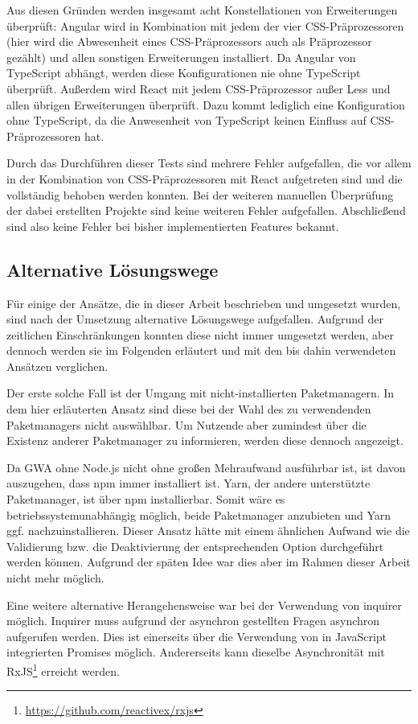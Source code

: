 Aus diesen Gründen werden insgesamt acht Konstellationen von Erweiterungen überprüft: Angular wird in Kombination mit jedem der vier CSS-Präprozessoren (hier wird die Abwesenheit eines CSS-Präprozessors auch als Präprozessor gezählt) und allen sonstigen Erweiterungen installiert. Da Angular von TypeScript abhängt, werden diese Konfigurationen nie ohne TypeScript überprüft. Außerdem wird React mit jedem CSS-Präprozessor außer Less und allen übrigen Erweiterungen überprüft. Dazu kommt lediglich eine Konfiguration ohne TypeScript, da die Anwesenheit von TypeScript keinen Einfluss auf CSS-Präprozessoren hat.

Durch das Durchführen dieser Tests sind mehrere Fehler aufgefallen, die vor allem in der Kombination von CSS-Präprozessoren mit React aufgetreten sind und die vollständig behoben werden konnten. Bei der weiteren manuellen Überprüfung der dabei erstellten Projekte sind keine weiteren Fehler aufgefallen. Abschließend sind also keine Fehler bei bisher implementierten Features bekannt.

\subsection{Alternative Lösungswege}
Für einige der Ansätze, die in dieser Arbeit beschrieben und umgesetzt wurden, sind nach der Umsetzung alternative Lösungswege aufgefallen. Aufgrund der zeitlichen Einschränkungen konnten diese nicht immer umgesetzt werden, aber dennoch werden sie im Folgenden erläutert und mit den bis dahin verwendeten Ansätzen verglichen.

Der erste solche Fall ist der Umgang mit nicht-installierten Paketmanagern. In dem hier erläuterten Ansatz sind diese bei der Wahl des zu verwendenden Paketmanagers nicht auswählbar. Um Nutzende aber zumindest über die Existenz anderer Paketmanager zu informieren, werden diese dennoch angezeigt.

Da \gls{GWA} ohne Node.js nicht ohne großen Mehraufwand ausführbar ist, ist davon auszugehen, dass \gls{npm} immer installiert ist. Yarn, der andere unterstützte Paketmanager, ist über \gls{npm} installierbar. Somit wäre es betriebssystemunabhängig möglich, beide Paketmanager anzubieten und Yarn ggf. nachzuinstallieren. Dieser Ansatz hätte mit einem ähnlichen Aufwand wie die Validierung bzw. die Deaktivierung der entsprechenden Option durchgeführt werden können. Aufgrund der späten Idee war dies aber im Rahmen dieser Arbeit nicht mehr möglich.

Eine weitere alternative Herangehensweise war bei der Verwendung von inquirer möglich. Inquirer muss aufgrund der asynchron gestellten Fragen asynchron aufgerufen werden. Dies ist einerseits über die Verwendung von in JavaScript integrierten Promises möglich. Andererseits kann dieselbe Asynchronität mit RxJS\footnote{\url{https://github.com/reactivex/rxjs}} erreicht werden.

